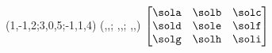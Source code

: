 \MATRIXABSVALUE(1,-1,2;3,0,5;-1,1,4)%
          (\sola,\solb,\solc;
           \sold,\sole,\solf;
           \solg,\solh,\soli)
$\begin{bmatrix}
       \sola & \solb & \solc \\
       \sold & \sole & \solf \\
       \solg & \solh & \soli
 \end{bmatrix}$
